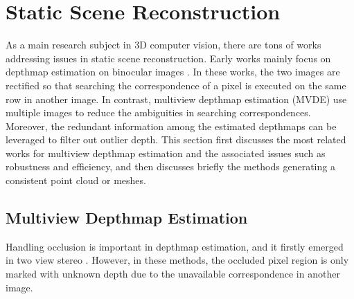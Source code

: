 \section{Static Scene Reconstruction}
As a main research subject in 3D computer vision, there are tons of works addressing issues in static scene reconstruction. Early works mainly focus on depthmap estimation on binocular images \cite{boykov2001fast,Sun_ECCV2002_stereoBeliefProp,scharstein2002taxonomy,scharstein2007learning}. 
In these works, the two images are rectified so that searching the correspondence of a pixel is executed on the same row in another image. In contrast, multiview depthmap estimation (MVDE) use multiple images to reduce the ambiguities in searching correspondences. Moreover, the redundant information among the estimated depthmaps can be leveraged to filter out outlier depth. 
This section first discusses the most related works for multiview depthmap estimation and the associated issues such as  robustness and efficiency, and then discusses briefly the methods generating a consistent point cloud or meshes.

\subsection{Multiview Depthmap Estimation}
Handling occlusion is important in depthmap estimation, and it firstly emerged in two view stereo \cite{Sun_ECCV2002_stereoBeliefProp, Sun_CVPR2005_stereo, Xiao:2008}. However, in these methods, the occluded pixel region is only marked with unknown depth due to the unavailable correspondence in another image. 

